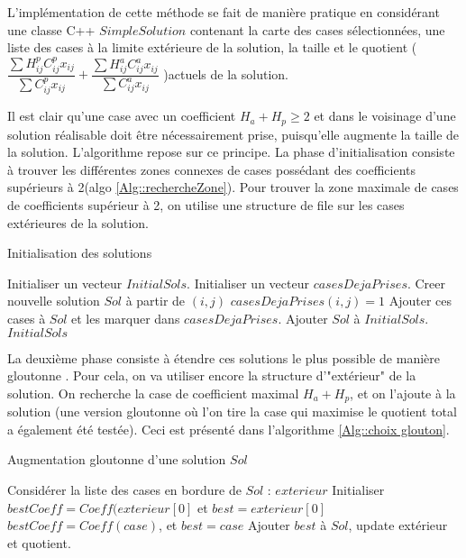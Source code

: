 \documentclass[12pt,a4paper]{article}
\begin{document}
L'implémentation de cette méthode se fait de manière pratique en considérant une classe C++ $SimpleSolution$ contenant la carte des cases sélectionnées, une liste des cases à la limite extérieure de la solution, la taille et le quotient ($ \dfrac{\sum H_{ij}^pC_{ij}^p x_{ij}}{\sum C_{ij}^p x_{ij}}+ \dfrac{\sum H_{ij}^a C_{ij}^a x_{ij}}{\sum C_{ij}^a x_{ij}} $ )actuels  de la solution.

\vspace{0.5cm}

Il est clair qu'une case avec un coefficient $H_a + H_p \geq 2$ et dans le voisinage d'une solution réalisable doit être nécessairement prise, puisqu'elle augmente la taille de la solution.
 L'algorithme repose sur ce principe. La phase d'initialisation consiste à trouver les différentes zones connexes de cases  possédant des coefficients supérieurs à 2(algo \ref{Alg::rechercheZone}). Pour trouver la zone maximale de cases de coefficients supérieur à  2, on utilise une structure de file sur les cases extérieures de la solution.
 
 \vspace{0.5cm}


 \begin{algorithm}
	\caption{Initialisation des solutions}
	\begin{algorithmic}[1]
	\STATE Initialiser un vecteur $InitialSols$.
	\STATE Initialiser un vecteur $casesDejaPrises$.
			\STATE Creer nouvelle solution $Sol$ à partir de $(i,j)$
			\STATE $casesDejaPrises(i,j)=1$
				\STATE Ajouter ces cases à $Sol$ et les marquer dans $casesDejaPrises$.					\ENDWHILE
		\STATE Ajouter $Sol$ à $InitialSols$.
		\ENDIF
	\ENDFOR
	\RETURN $InitialSols$	
	\end{algorithmic}
	 	\label{Alg::rechercheZone}
\end{algorithm}

 
La deuxième phase consiste à étendre ces solutions le plus possible de manière gloutonne . Pour cela, on va utiliser encore la structure d'"extérieur" de la solution. On recherche la case de coefficient maximal $H_a+H_p$, et on l'ajoute à la solution (une version gloutonne où l'on tire la case qui maximise le quotient total a également été testée). Ceci est présenté dans l'algorithme \ref{Alg::choix glouton}.


 \begin{algorithm}
	\caption{Augmentation gloutonne d'une solution $Sol$}
	\begin{algorithmic}[1]
	\STATE Considérer la liste des cases en bordure de $Sol$ : $exterieur$
	\STATE Initialiser $bestCoeff =Coeff(exterieur[0]$ et $best=exterieur[0]$
			\STATE $bestCoeff=Coeff(case)$, et $best = case$
			\ENDIF
	\ENDFOR
			\STATE Ajouter $best$ à $Sol$, update  extérieur et quotient.
	\ENDIF
	\end{algorithmic}
	 	\label{Alg::choix glouton}
\end{algorithm}
\end{document}
